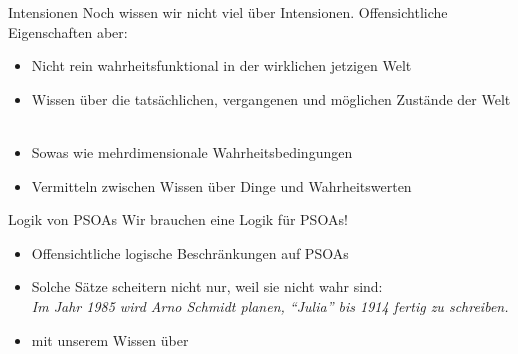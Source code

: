 \begin{frame}
  {Intensionen}
  \onslide<+->
  \onslide<+->
  Noch wissen wir nicht viel über Intensionen. Offensichtliche Eigenschaften aber:\\
  \Halbzeile
  \begin{itemize}[<+->]
    \item Nicht rein wahrheitsfunktional in der wirklichen jetzigen Welt\\
    \item Wissen über die \alert{tatsächlichen}, \alert{vergangenen} und \alert{möglichen} Zustände der Welt\\
      \\
    \item Sowas wie \alert{mehrdimensionale Wahrheitsbedingungen}
    \item Vermitteln zwischen Wissen über Dinge und Wahrheitswerten
  \end{itemize}
\end{frame}

\begin{frame}
  {Logik von PSOAs}
  \onslide<+->
  \onslide<+->
  Wir brauchen eine Logik für PSOAs!\\
  \Halbzeile
  \begin{itemize}[<+->]
    \item Offensichtliche \alert{logische Beschränkungen auf PSOAs}
      \Halbzeile
    \item Solche Sätze scheitern nicht nur, weil sie nicht wahr sind:\\
      \alert{\textit{Im Jahr 1985 wird Arno Schmidt planen, "`\textit{Julia}"' bis 1914 fertig zu schreiben.}}
      \Halbzeile
    \item {} mit unserem Wissen über 
  \end{itemize}
\end{frame}

